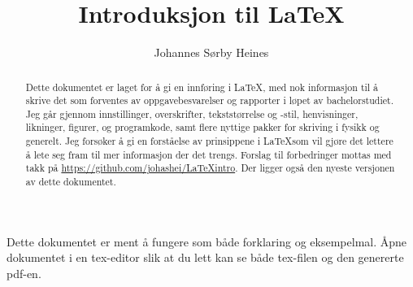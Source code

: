 



\title{Introduksjon til \LaTeX} %
\author{Johannes Sørby Heines} %

\maketitle  %

\begin{abstract} %
	Dette dokumentet er laget for å gi en innføring i \LaTeX, med nok informasjon til å skrive
	det som forventes av oppgavebesvarelser og rapporter i løpet av bachelorstudiet.
	Jeg går gjennom innstillinger, overskrifter, tekststørrelse og -stil, henvisninger,
	likninger, figurer, og programkode, samt flere nyttige pakker for skriving i fysikk 
	og generelt. Jeg forsøker å gi en forståelse av prinsippene i \LaTeX som vil gjøre det 
	lettere å lete seg fram til mer informasjon der det trengs.
	Forslag til forbedringer mottas med takk på \url{https://github.com/johashei/LaTeXintro}.
	Der ligger også den nyeste versjonen av dette dokumentet.
\end{abstract}


Dette dokumentet er ment å fungere som både forklaring og eksempelmal. Åpne dokumentet i en
tex-editor slik at du lett kan se både tex-filen og den genererte pdf-en.


